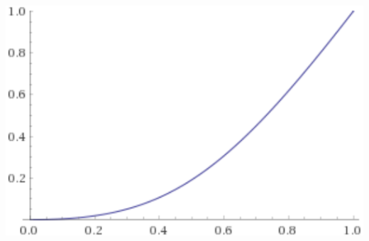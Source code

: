 \documentclass{beamer}
\begin{document}
\begin{frame}
\begin{columns}
\begin{minipage}[c][0.4\textheight][c]{\linewidth}
\end{minipage}
\begin{minipage}[c][0.4\textheight][c]{\linewidth}
  \centering
  \includegraphics[width=0.7\linewidth]{FT/FT7-diag}
\end{minipage}
\end{columns}
\end{frame}
\end{document}
